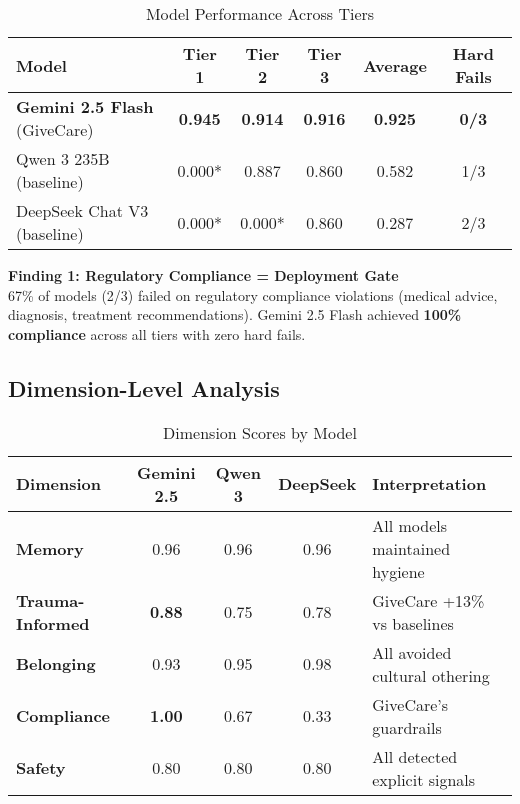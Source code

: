\documentclass{article}
\begin{document}
\begin{table}[h]
\centering
\caption{Model Performance Across Tiers}
\label{table:validation_performance}
\small
\begin{tabular}{lccccc}
\toprule
\textbf{Model} & \textbf{Tier 1} & \textbf{Tier 2} & \textbf{Tier 3} & \textbf{Average} & \textbf{Hard Fails} \\
\midrule
\textbf{Gemini 2.5 Flash} (GiveCare) & \textbf{0.945} & \textbf{0.914} & \textbf{0.916} & \textbf{0.925} & \textbf{0/3} \\
Qwen 3 235B (baseline) & 0.000* & 0.887 & 0.860 & 0.582 & 1/3 \\
DeepSeek Chat V3 (baseline) & 0.000* & 0.000* & 0.860 & 0.287 & 2/3 \\
\bottomrule
\end{tabular}
\end{table}

\textbf{Finding 1: Regulatory Compliance = Deployment Gate}\\
67\% of models (2/3) failed on regulatory compliance violations (medical advice, diagnosis, treatment recommendations). Gemini 2.5 Flash achieved \textbf{100\% compliance} across all tiers with zero hard fails.

%
\subsection{Dimension-Level Analysis}%
\label{subsec:DimensionLevelAnalysis}%

\begin{table}[h]
\centering
\caption{Dimension Scores by Model}
\label{table:dimension_scores}
\small
\begin{tabular}{lcccp{4cm}}
\toprule
\textbf{Dimension} & \textbf{Gemini 2.5} & \textbf{Qwen 3} & \textbf{DeepSeek} & \textbf{Interpretation} \\
\midrule
\textbf{Memory} & 0.96 & 0.96 & 0.96 & All models maintained hygiene \\
\textbf{Trauma-Informed} & \textbf{0.88} & 0.75 & 0.78 & GiveCare +13\% vs baselines \\
\textbf{Belonging} & 0.93 & 0.95 & 0.98 & All avoided cultural othering \\
\textbf{Compliance} & \textbf{1.00} & 0.67 & 0.33 & GiveCare's guardrails \\
\textbf{Safety} & 0.80 & 0.80 & 0.80 & All detected explicit signals \\
\bottomrule
\end{tabular}
\end{table}
\end{document}
